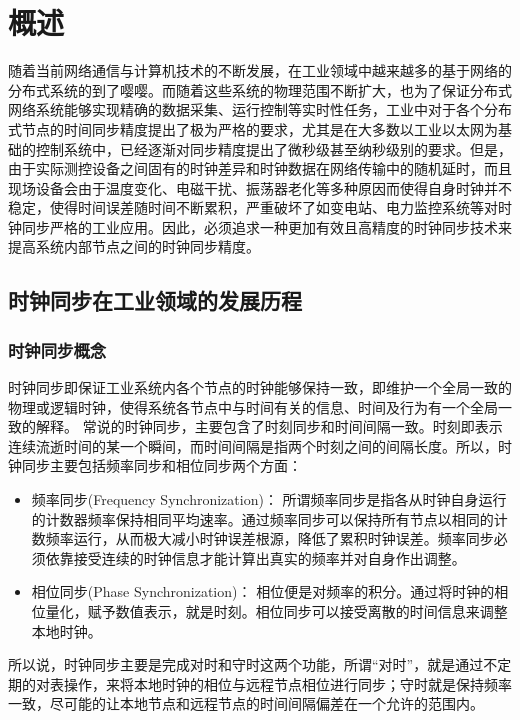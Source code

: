 
\chapter{概述}
\label{chap:intro}
随着当前网络通信与计算机技术的不断发展，在工业领域中越来越多的基于网络的分布式系统的到了嘤嘤。而随着这些系统的物理范围不断扩大，也为了保证分布式网络系统能够实现精确的数据采集、运行控制等实时性任务，工业中对于各个分布式节点的时间同步精度提出了极为严格的要求，尤其是在大多数以工业以太网为基础的控制系统中，已经逐渐对同步精度提出了微秒级甚至纳秒级别的要求。但是，由于实际测控设备之间固有的时钟差异和时钟数据在网络传输中的随机延时，而且现场设备会由于温度变化、电磁干扰、振荡器老化等多种原因而使得自身时钟并不稳定，使得时间误差随时间不断累积，严重破坏了如变电站、电力监控系统等对时钟同步严格的工业应用。因此，必须追求一种更加有效且高精度的时钟同步技术来提高系统内部节点之间的时钟同步精度。

\section{时钟同步在工业领域的发展历程}
\subsection{时钟同步概念}
\label{sec:concept}
时钟同步即保证工业系统内各个节点的时钟能够保持一致，即维护一个全局一致的物理或逻辑时钟，使得系统各节点中与时间有关的信息、时间及行为有一个全局一致的解释\supercite{1}。
常说的时钟同步，主要包含了时刻同步和时间间隔一致。时刻即表示连续流逝时间的某一个瞬间，而时间间隔是指两个时刻之间的间隔长度。所以，时钟同步主要包括频率同步和相位同步两个方面：
\begin{itemize}[noitemsep,topsep=0pt,parsep=0pt,partopsep=0pt]
	\item 频率同步(Frequency Synchronization)：
		所谓频率同步是指各从时钟自身运行的计数器频率保持相同平均速率。通过频率同步可以保持所有节点以相同的计数频率运行，从而极大减小时钟误差根源，降低了累积时钟误差。频率同步必须依靠接受连续的时钟信息才能计算出真实的频率并对自身作出调整。
	\item 相位同步(Phase Synchronization)：
		相位便是对频率的积分。通过将时钟的相位量化，赋予数值表示，就是时刻。相位同步可以接受离散的时间信息来调整本地时钟。
\end{itemize}

所以说，时钟同步主要是完成对时和守时这两个功能，所谓“对时”，就是通过不定期的对表操作，来将本地时钟的相位与远程节点相位进行同步；守时就是保持频率一致，尽可能的让本地节点和远程节点的时间间隔偏差在一个允许的范围内。


